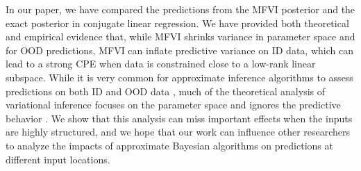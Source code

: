 \documentclass{article}
\theoremstyle{plain}
\theoremstyle{definition}
\theoremstyle{remark}
\theoremstyle{plain}
\begin{document}


In our paper, we have compared the predictions from the MFVI posterior and the exact posterior in conjugate linear regression. We have provided both theoretical and empirical evidence that, while MFVI shrinks variance in parameter space and for OOD predictions, MFVI can inflate predictive variance on ID data, which can lead to a strong CPE when data is constrained close to a low-rank linear subspace. While it is very common for approximate inference algorithms to assess predictions on both ID and OOD data \citep[e.g.,][]{shen2024variational, fadel2025viking}, much of the theoretical analysis of variational inference focuses on the parameter space and ignores the predictive behavior \citep{wainwright2008graphical,margossian2023shrinkage, margossian2024variational,  margossian2025variational, zellinger2026even, marks2026symmetry}. We show that this analysis can miss important effects when the inputs are highly structured, and we hope that our work can influence other researchers to analyze the impacts of approximate Bayesian algorithms on predictions at different input locations. 




\end{document}
